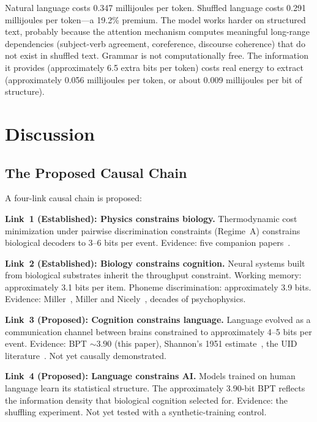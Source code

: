 \documentclass[11pt]{article}
\begin{document}
Natural language costs 0.347 millijoules per token. Shuffled language costs 0.291 millijoules per token---a 19.2\% premium. The model works harder on structured text, probably because the attention mechanism computes meaningful long-range dependencies (subject-verb agreement, coreference, discourse coherence) that do not exist in shuffled text. Grammar is not computationally free. The information it provides (approximately 6.5 extra bits per token) costs real energy to extract (approximately 0.056 millijoules per token, or about 0.009 millijoules per bit of structure).

\section{Discussion}

\subsection{The Proposed Causal Chain}

A four-link causal chain is proposed:

\textbf{Link~1 (Established): Physics constrains biology.} Thermodynamic cost minimization under pairwise discrimination constraints (Regime~A) constrains biological decoders to 3--6 bits per event. Evidence: five companion papers~\cite{whitmer2026fons,whitmer2026floor,whitmer2026basin,whitmer2026serial,whitmer2026dissipative}.

\textbf{Link~2 (Established): Biology constrains cognition.} Neural systems built from biological substrates inherit the throughput constraint. Working memory: approximately 3.1 bits per item. Phoneme discrimination: approximately 3.9 bits. Evidence: Miller~\cite{miller1956}, Miller and Nicely~\cite{miller1955}, decades of psychophysics.

\textbf{Link~3 (Proposed): Cognition constrains language.} Language evolved as a communication channel between brains constrained to approximately 4--5 bits per event. Evidence: BPT $\sim 3.90$ (this paper), Shannon's 1951 estimate~\cite{shannon1951}, the UID literature~\cite{jaeger2010}. Not yet causally demonstrated.

\textbf{Link~4 (Proposed): Language constrains AI.} Models trained on human language learn its statistical structure. The approximately 3.90-bit BPT reflects the information density that biological cognition selected for. Evidence: the shuffling experiment. Not yet tested with a synthetic-training control.
\end{document}
